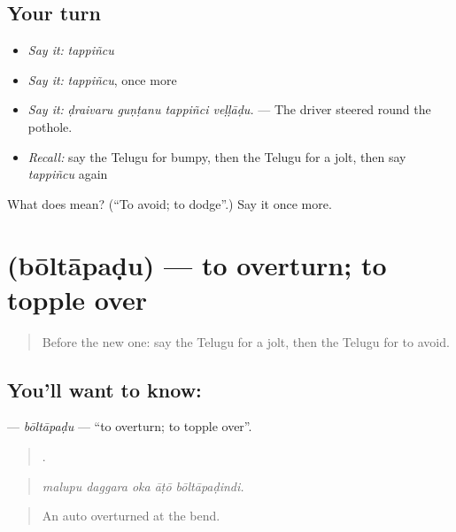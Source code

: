 \subsection*{Your turn}
\begin{itemize}
\raggedright
  \item \emph{Say it:} \emph{tappiñcu}
  \item \emph{Say it:} \emph{tappiñcu}, once more
  \item \emph{Say it:} \emph{ḍraivaru guṇṭanu tappiñci veḷḷāḍu.} — The driver steered round the pothole.
  \item \emph{Recall:} say the Telugu for bumpy, then the Telugu for a jolt, then say \emph{tappiñcu} again
\end{itemize}

\begin{tcolorbox}[breakable,colback=teal!4,colframe=teal!35!black,title={Before you move on}]
What does  mean? (\textquotedblleft{}To avoid; to dodge\textquotedblright{}.) Say it once more.
\end{tcolorbox}
\section[\texorpdfstring{\te{బోల్తాపడు} (bōltāpaḍu)}{బోల్తాపడు (bōltāpaḍu)}]{ (bōltāpaḍu) — to overturn; to topple over}

\label{lesson:TE-C446-boltapadu}



\begin{quote}
Before the new one: say the Telugu for a jolt, then the Telugu for to avoid.
\end{quote}

\subsection*{You'll want to know: }
\textbf{} — \emph{bōltāpaḍu} — \textquotedblleft{}to overturn; to topple over\textquotedblright{}.

\begin{quote}
    .
\end{quote}

\begin{quote}
\emph{malupu daggara oka āṭō bōltāpaḍindi.}
\end{quote}

\begin{quote}
An auto overturned at the bend.
\end{quote}


